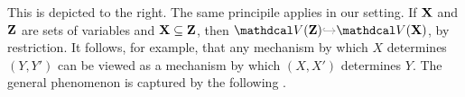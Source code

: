 This is depicted to the right.
%
The same principile applies in our setting.
If $\mathbf X$ and $\mathbf Z$ are sets of variables and $\mathbf X \subseteq \mathbf Z$, then 
$\V(\mat Z) {\color{gray}\hookrightarrow} \V(\mat X)$, by restriction. 
It follows, for example, that
    any mechanism by which $X$ determines $(Y,Y')$ can be viewed
        as a mechanism by which $(X,X')$ determines $Y$. 
The general phenomenon is captured by the following
    \unskip.

